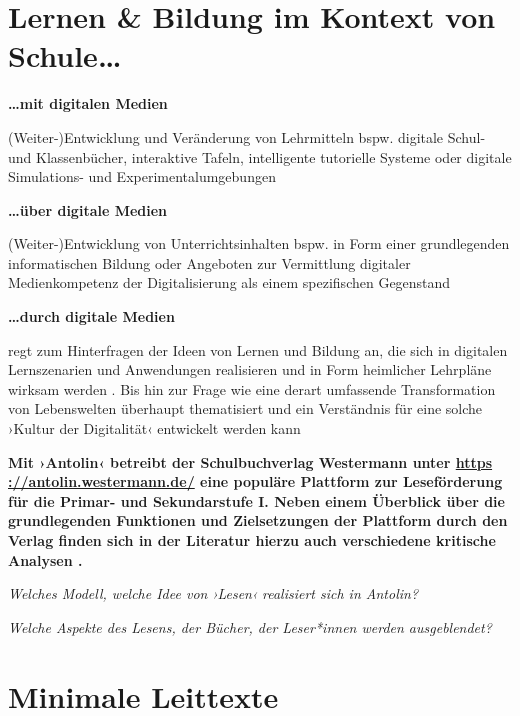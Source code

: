 \documentclass[
  a4paper,
]{book}
\begin{document}
\section{Lernen \& Bildung im Kontext von Schule\ldots{}}\label{lernen-bildung-im-kontext-von-schule}

\textbf{\ldots mit digitalen Medien}

(Weiter-)Entwicklung und Veränderung von Lehrmitteln
bspw. digitale Schul- und Klassenbücher, interaktive Tafeln, intelligente tutorielle Systeme oder digitale Simulations- und Experimentalumgebungen

\textbf{\ldots über digitale Medien}

(Weiter-)Entwicklung von Unterrichtsinhalten bspw. in Form einer grundlegenden informatischen Bildung oder Angeboten zur Vermittlung digitaler Medienkompetenz der Digitalisierung als einem spezifischen Gegenstand

\textbf{\ldots durch digitale Medien}

regt zum Hinterfragen der Ideen von Lernen und Bildung an, die sich in digitalen Lernszenarien und Anwendungen realisieren und in Form heimlicher Lehrpläne wirksam werden \citep[z. B.][]{darvinYouthTechnologyHidden2019, decuypereResearchingEducationalApps2019, edwardsSoftwareHiddenCurriculum2015}.
Bis hin zur Frage wie eine derart umfassende Transformation von Lebenswelten überhaupt thematisiert und ein Verständnis für eine solche ›Kultur der Digitalität‹ \citep{stalderKulturDigitalitat2016} entwickelt werden kann

\begin{blackbox}
\textbf{Mit ›Antolin‹ betreibt der Schulbuchverlag Westermann unter \href{ttps\%20://antolin.westermann.de/}{https ://antolin.westermann.de/} eine populäre Plattform zur Leseförderung für die Primar- und Sekundarstufe I. Neben einem Überblick über die grundlegenden Funktionen und Zielsetzungen der Plattform durch den Verlag \citep{westermanngruppeAntolinProgrammZur2022} finden sich in der Literatur hierzu auch verschiedene kritische Analysen \citep{jornitzsieglindeMitAntolinPunkten2018, forschlerZurAmbivalentenWirkmachtigkeit2021}.}

\emph{Welches Modell, welche Idee von ›Lesen‹ realisiert sich in Antolin?}

\emph{Welche Aspekte des Lesens, der Bücher, der Leser*innen werden ausgeblendet?}

\end{blackbox}

\section{Minimale Leittexte}\label{minimale-leittexte}
\end{document}
